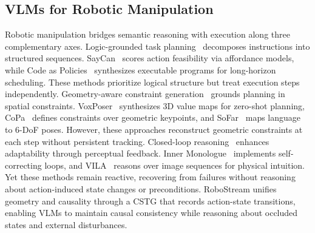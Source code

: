 \subsection{VLMs for Robotic Manipulation}
Robotic manipulation bridges semantic reasoning with execution along three complementary axes.
Logic-grounded task planning~\cite{huang2022language, singh2023progprompt, zengsocratic, huang2023grounded} decomposes instructions into structured sequences. SayCan~\cite{brohan2023saycan} scores action feasibility via affordance models, while Code as Policies~\cite{liang2023code} synthesizes executable programs for long-horizon scheduling. These methods prioritize logical structure but treat execution steps independently.
Geometry-aware constraint generation~\cite{yu2023language, sharma2022correcting, yuan2025robopoint, huang2025rekep, huang2025a3vlm, fang2024moka} grounds planning in spatial constraints. VoxPoser~\cite{huang2023voxposer} synthesizes 3D value maps for zero-shot planning, CoPa~\cite{huang2024copa} defines constraints over geometric keypoints, and SoFar~\cite{qisofar} maps language to 6-DoF poses. However, these approaches reconstruct geometric constraints at each step without persistent tracking.
Closed-loop reasoning~\cite{driess2023palm, du2023vision, zhou2025code, liuinteractive} enhances adaptability through perceptual feedback. Inner Monologue~\cite{huang2023inner} implements self-correcting loops, and VILA~\cite{hu2024look} reasons over image sequences for physical intuition. Yet these methods remain reactive, recovering from failures without reasoning about action-induced state changes or preconditions.
RoboStream unifies geometry and causality through a CSTG that records action-state transitions, enabling VLMs to maintain causal consistency while reasoning about occluded states and external disturbances.

